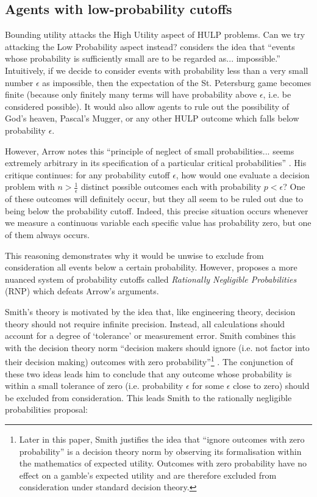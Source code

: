 \documentclass{article}
\begin{document}
\subsection{Agents with low-probability cutoffs}

Bounding utility attacks the High Utility aspect of HULP problems. Can we try attacking the Low Probability aspect instead? \citep[pg. 414]{arrow1951alternative} considers the idea that ``events whose probability is sufficiently small are to be regarded as... impossible.'' Intuitively, if we decide to consider events with probability less than a very small number \(\epsilon\) as impossible, then the expectation of the St. Petersburg game becomes finite (because only finitely many terms will have probability above \(\epsilon\), i.e. be considered possible). It would also allow agents to rule out the possibility of God's heaven, Pascal's Mugger, or any other HULP outcome which falls below probability \(\epsilon\).

However, Arrow notes this ``principle of neglect of small probabilities... seems extremely arbitrary in its specification of a particular critical probabilities'' \citep[pg. 414]{arrow1951alternative}. His critique continues: for any probability cutoff \(\epsilon\), how would one evaluate a decision problem with \(n > \frac{1}{\epsilon}\) distinct possible outcomes each with probability \(p < \epsilon\)? One of these outcomes will definitely occur, but they all seem to be ruled out due to being below the probability cutoff. Indeed, this precise situation occurs whenever we measure a continuous variable \textemdash{} each specific value has probability zero, but one of them always occurs.

This reasoning demonstrates why it would be unwise to exclude from consideration all events below a certain probability. However, \citep{smith2014evaluative} proposes a more nuanced system of probability cutoffs called \textit{Rationally Negligible Probabilities} (RNP) which defeats Arrow's arguments.

Smith's theory is motivated by the idea that, like engineering theory, decision theory should not require infinite precision. Instead, all calculations should account for a degree of `tolerance' or measurement error. Smith combines this with the decision theory norm ``decision makers should ignore (i.e. not factor into their decision making) outcomes with zero probability''\footnote{Later in this paper, Smith justifies the idea that ``ignore outcomes with zero probability'' is a decision theory norm by observing its formalisation within the mathematics of expected utility. Outcomes with zero probability have no effect on a gamble's expected utility and are therefore excluded from consideration under standard decision theory.} \citep[pg. 472]{smith2014evaluative}. The conjunction of these two ideas leads him to conclude that any outcome whose probability is within a small tolerance of zero (i.e. probability \(\epsilon\) for some \(\epsilon\) close to zero) should be excluded from consideration. This leads Smith to the rationally negligible probabilities proposal:
\end{document}
